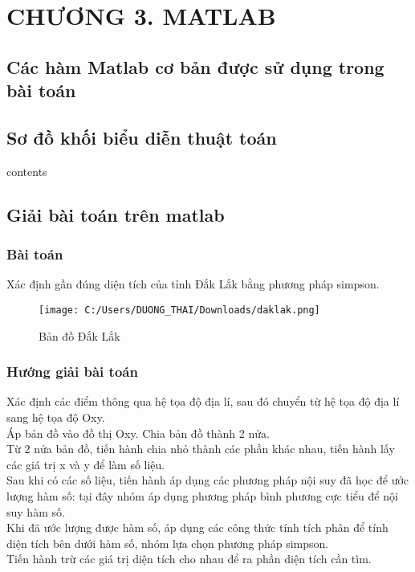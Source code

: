 \documentclass[14pt,a4paper]{article}
\begin{document}
\section*{CHƯƠNG 3. MATLAB}
\subsection { Các hàm Matlab cơ bản được sử dụng trong bài toán}
\subsection{Sơ đồ khối biểu diễn thuật toán}
contents
\subsection{Giải bài toán trên matlab}
\subsubsection{Bài toán}
Xác định gần đúng diện tích của tỉnh Đắk Lắk bằng phương pháp simpson. \vspace{9pt}\\
\begin{figure}[H]
	\centering
	\setcounter{figure}{0}
	\texttt{[image: C:/Users/DUONG\_THAI/Downloads/daklak.png]}
	\caption[Bản đồ Đắk Lắk ]{Bản đồ Đắk Lắk}
	\label{hinh31}
\end{figure} 
\subsubsection{Hướng giải bài toán}
Xác định các điểm thông qua hệ tọa độ địa lí, sau đó chuyển từ hệ tọa độ địa lí sang hệ tọa độ Oxy. \vspace{6pt}\\
\hspace*{30pt}Áp bản đồ vào đồ thị Oxy. Chia bản đồ thành 2 nửa.\vspace{6pt}\\
\hspace*{30pt}Từ 2 nửa bản đồ, tiến hành chia nhỏ thành các phần khác nhau, tiến hành lấy các giá trị x và y để làm số liệu. \vspace{6pt}\\
\hspace*{30pt} Sau khi có các số liệu, tiến hành áp dụng các phương pháp nội suy đã học để ước lượng hàm số: tại đây nhóm áp dụng phương pháp bình phương cực tiểu để nội suy hàm số.\vspace{6pt}\\
\hspace*{30pt}Khi đã ước lượng được hàm số, áp dụng các công thức tính tích phân để tính diện tích bên dưới hàm số, nhóm lựa chọn phương pháp simpson.\vspace{6pt}\\
\hspace*{30pt}Tiến hành trừ các giá trị diện tích cho nhau để ra phần diện tích cần tìm.\vspace{6pt}\\
\end{document}
